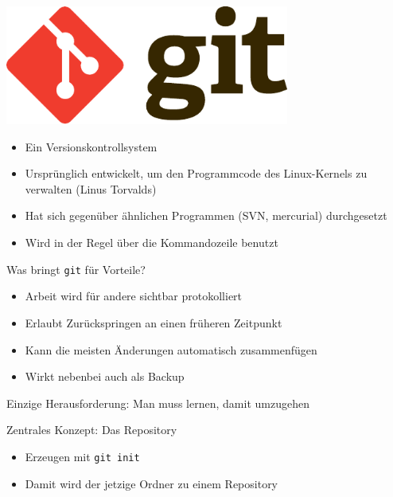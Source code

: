 \begin{frame}
    \centering
    \includegraphics[width=0.7\textwidth]{logos/git.pdf}

    \vspace{1em}

    \begin{itemize}
      \item Ein Versionskontrollsystem
      \item Ursprünglich entwickelt, um den Programmcode des Linux-Kernels zu verwalten (Linus Torvalds)
      \item Hat sich gegenüber ähnlichen Programmen (SVN, mercurial) durchgesetzt
      \item Wird in der Regel über die Kommandozeile benutzt
    \end{itemize}
\end{frame}

\begin{frame}{Was bringt \texttt{git} für Vorteile?}
  \begin{itemize}
    \item Arbeit wird für andere sichtbar protokolliert
    \item Erlaubt Zurückspringen an einen früheren Zeitpunkt
    \item Kann die meisten Änderungen automatisch zusammenfügen
    \item Wirkt nebenbei auch als Backup
  \end{itemize}
  Einzige Herausforderung: Man muss lernen, damit umzugehen
\end{frame}

\begin{frame}{Zentrales Konzept: Das Repository}
  \begin{itemize}
    \item Erzeugen mit \texttt{git init}
    \item Damit wird der jetzige Ordner zu einem Repository
  \end{itemize}
  \vspace{3em}
  \centering
\end{frame}

